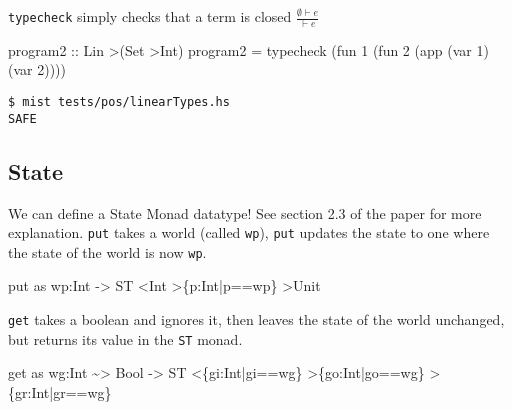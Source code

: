\documentclass[
]{darts-v2021}
\newenvironment{Shaded}{}{}
\newcommand{\DataTypeTok}[1]{\textcolor[rgb]{0.56,0.13,0.00}{#1}}
\newcommand{\DecValTok}[1]{\textcolor[rgb]{0.25,0.63,0.44}{#1}}
\newcommand{\NormalTok}[1]{#1}
\newcommand{\OperatorTok}[1]{\textcolor[rgb]{0.40,0.40,0.40}{#1}}
\newcommand{\OtherTok}[1]{\textcolor[rgb]{0.00,0.44,0.13}{#1}}
\begin{document}
\texttt{typecheck} simply checks that a term is closed
\(\frac{\emptyset\vdash e}{\vdash e}\)

\begin{Shaded}
\begin{Highlighting}[numbers=left,,firstnumber=25,]
\OtherTok{program2 ::} \DataTypeTok{Lin} \OperatorTok{\textgreater{}}\NormalTok{(}\DataTypeTok{Set} \OperatorTok{\textgreater{}}\DataTypeTok{Int}\NormalTok{)}
\NormalTok{program2 }\OtherTok{=}\NormalTok{ typecheck (fun }\DecValTok{1}\NormalTok{ (fun }\DecValTok{2}\NormalTok{ (app (var }\DecValTok{1}\NormalTok{) (var }\DecValTok{2}\NormalTok{))))}
\end{Highlighting}
\end{Shaded}

\begin{verbatim}
$ mist tests/pos/linearTypes.hs
SAFE
\end{verbatim}

\hypertarget{state}{%
\subsection{State}\label{state}}

We can define a State Monad datatype! See section 2.3 of the paper for
more explanation. \texttt{put} takes a world (called \texttt{wp}),
\texttt{put} updates the state to one where the state of the world is
now \texttt{wp}.

\begin{Shaded}
\begin{Highlighting}[numbers=left,,firstnumber=20,]
\NormalTok{put as wp}\OperatorTok{:}\DataTypeTok{Int} \OtherTok{{-}\textgreater{}} \DataTypeTok{ST} \OperatorTok{\textless{}}\DataTypeTok{Int} \OperatorTok{\textgreater{}}\NormalTok{\{p}\OperatorTok{:}\DataTypeTok{Int}\OperatorTok{|}\NormalTok{p}\OperatorTok{==}\NormalTok{wp\} }\OperatorTok{\textgreater{}}\DataTypeTok{Unit}
\end{Highlighting}
\end{Shaded}

\texttt{get} takes a boolean and ignores it, then leaves the state of
the world unchanged, but returns its value in the \texttt{ST} monad.

\begin{Shaded}
\begin{Highlighting}[numbers=left,,firstnumber=17,]
\NormalTok{get as wg}\OperatorTok{:}\DataTypeTok{Int} \OperatorTok{\textasciitilde{}\textgreater{}} \DataTypeTok{Bool} \OtherTok{{-}\textgreater{}} \DataTypeTok{ST} \OperatorTok{\textless{}}\NormalTok{\{gi}\OperatorTok{:}\DataTypeTok{Int}\OperatorTok{|}\NormalTok{gi}\OperatorTok{==}\NormalTok{wg\} }\OperatorTok{\textgreater{}}\NormalTok{\{go}\OperatorTok{:}\DataTypeTok{Int}\OperatorTok{|}\NormalTok{go}\OperatorTok{==}\NormalTok{wg\} }\OperatorTok{\textgreater{}}\NormalTok{\{gr}\OperatorTok{:}\DataTypeTok{Int}\OperatorTok{|}\NormalTok{gr}\OperatorTok{==}\NormalTok{wg\}}
\end{Highlighting}
\end{Shaded}
\end{document}

